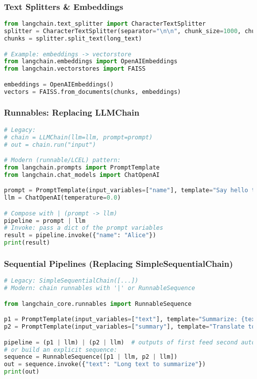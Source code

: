 \begin{frame}[fragile]\frametitle{Text Splitters \& Embeddings}
\begin{lstlisting}[language=python,basicstyle=\tiny]
from langchain.text_splitter import CharacterTextSplitter
splitter = CharacterTextSplitter(separator="\n\n", chunk_size=1000, chunk_overlap=200)
chunks = splitter.split_text(long_text)

# Example: embeddings -> vectorstore
from langchain.embeddings import OpenAIEmbeddings
from langchain.vectorstores import FAISS

embeddings = OpenAIEmbeddings()
vectors = FAISS.from_documents(chunks, embeddings)
\end{lstlisting}
\end{frame}

\begin{frame}[fragile]\frametitle{Runnables: Replacing LLMChain}
\begin{lstlisting}[language=python,basicstyle=\tiny]
# Legacy:
# chain = LLMChain(llm=llm, prompt=prompt)
# out = chain.run("input")

# Modern (runnable/LCEL) pattern:
from langchain.prompts import PromptTemplate
from langchain.chat_models import ChatOpenAI

prompt = PromptTemplate(input_variables=["name"], template="Say hello to {name}.")
llm = ChatOpenAI(temperature=0.0)

# Compose with | (prompt -> llm)
pipeline = prompt | llm
# Invoke: pass a dict of the prompt variables
result = pipeline.invoke({"name": "Alice"})
print(result)
\end{lstlisting}
\end{frame}

\begin{frame}[fragile]\frametitle{Sequential Pipelines (Replacing SimpleSequentialChain)}
\begin{lstlisting}[language=python,basicstyle=\tiny]
# Legacy: SimpleSequentialChain([...])
# Modern: chain runnables with '|' or RunnableSequence

from langchain_core.runnables import RunnableSequence

p1 = PromptTemplate(input_variables=["text"], template="Summarize: {text}")
p2 = PromptTemplate(input_variables=["summary"], template="Translate to French: {summary}")

pipeline = (p1 | llm) | (p2 | llm)  # outputs of first feed second automatically
# or build an explicit sequence:
sequence = RunnableSequence([p1 | llm, p2 | llm])
out = sequence.invoke({"text": "Long text to summarize"})
print(out)
\end{lstlisting}
\end{frame}

